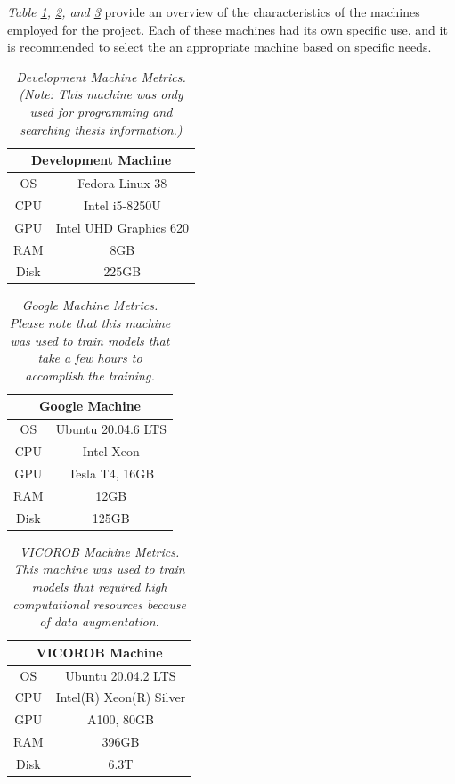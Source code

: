 \textit{Table \ref{table:dev-machine}, \ref{table:google-machine}, and \ref{table:vicorobot-machine}} provide an overview of the characteristics of the machines employed for the project. Each of these machines had its own specific use, and it is recommended to select the an appropriate machine based on specific needs.

\begin{table}[H]
	\centering
	\begin{tabular}{cc}
		\toprule
		\multicolumn{2}{c}{\textbf{Development Machine}} \\
		\midrule
		OS & Fedora Linux 38 \\
		CPU & Intel i5-8250U \\
		GPU & Intel UHD Graphics 620 \\
		RAM & 8GB \\
		Disk & 225GB \\
		\bottomrule
	\end{tabular}
  \caption[Development Machine Metrics.]{\textit{Development Machine Metrics. (Note: This machine was only used for programming and searching thesis information.)}}
	\label{table:dev-machine}
\end{table}


\begin{table}[H]
	\centering
	\begin{tabular}{cc}
			\toprule
			  \multicolumn{2}{c}{\textbf{Google Machine}} \\
			  \midrule
			  OS & Ubuntu 20.04.6 LTS \\
			  CPU & Intel Xeon \\
			  GPU & Tesla T4, 16GB \\
			  RAM & 12GB \\
			  Disk & 125GB \\
			  \bottomrule
\end{tabular}
\caption[Google Machine Metrics.]{\textit{Google Machine Metrics. Please note that this machine was used to train models that take a few hours to accomplish the training.}}
{\label{table:google-machine}}
\end{table}

\newpage

\begin{table}[H]
\centering
\begin{tabular}{cc}
	 \toprule
		\multicolumn{2}{c}{\textbf{VICOROB Machine}} \\
		\midrule
		OS & Ubuntu 20.04.2 LTS \\
		CPU & Intel(R) Xeon(R) Silver \\
		GPU & A100, 80GB\\
		RAM & 396GB \\
		Disk & 6.3T \\
		\bottomrule
\end{tabular}
\caption[VICOROB Machine Metrics.]{\textit{VICOROB Machine Metrics. This machine was used to train models that required high computational resources because of data augmentation.}}
{\label{table:vicorobot-machine}}
\end{table}

